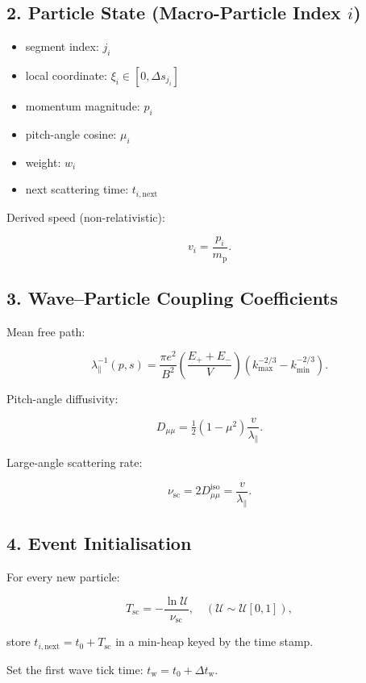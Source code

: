 {\subsection*{2. Particle State (Macro-Particle Index \( i \))}

\begin{itemize}
  \item segment index: \( j_i \)
  \item local coordinate: \( \xi_i \in [0, \Delta s_{j_i}] \)
  \item momentum magnitude: \( p_i \)
  \item pitch-angle cosine: \( \mu_i \)
  \item weight: \( w_i \)
  \item next scattering time: \( t_{i,\mathrm{next}} \)
\end{itemize}

Derived speed (non-relativistic):

\[
v_i = \frac{p_i}{m_{\mathrm{p}}}.
\]

\subsection*{3. Wave–Particle Coupling Coefficients}

Mean free path:

\[
\lambda_{\parallel}^{-1}(p,s) =
\frac{\pi e^2}{B^2}
\left( \frac{E_+ + E_-}{V} \right)
\left( k_{\max}^{-2/3} - k_{\min}^{-2/3} \right).
\]

Pitch-angle diffusivity:

\[
D_{\mu\mu} = \tfrac12 (1 - \mu^2) \frac{v}{\lambda_{\parallel}}.
\]

Large-angle scattering rate:

\[
\nu_{\mathrm{sc}} = 2 D_{\mu\mu}^{\text{iso}} = \frac{v}{\lambda_{\parallel}}.
\]

\subsection*{4. Event Initialisation}

For every new particle:

\[
T_{\mathrm{sc}} = -\frac{\ln \mathcal{U}}{\nu_{\mathrm{sc}}}, \quad (\mathcal{U} \sim \mathcal{U}[0,1]),
\]

store \( t_{i,\mathrm{next}} = t_0 + T_{\mathrm{sc}} \) in a min-heap keyed by the time stamp.

Set the first wave tick time: \( t_{\mathrm{w}} = t_0 + \Delta t_{\mathrm{w}} \).

}
